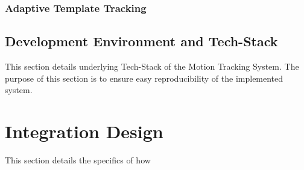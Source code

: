 \subsubsection{Adaptive Template Tracking}


\subsection{Development Environment and Tech-Stack}
This section details underlying Tech-Stack of the Motion Tracking System. The
purpose of this section is to ensure easy reproducibility of the implemented
system.

\subsubsection{}

\section{Integration Design}
This section details the specifics of how 





